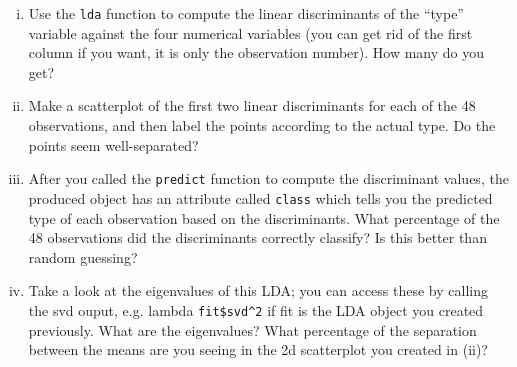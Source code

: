 \documentclass[11pt]{article}
\theoremstyle{definition}
\newcommand{\1}[1]{\mathbf{1} \left \{ #1 \right \}}
\begin{document}
\begin{enumerate}
	\begin{enumerate}[(i)]
		\item Use the \texttt{lda} function to compute the linear discriminants of the ``type'' variable against the four numerical variables (you can get rid of the first column if you want, it is only the observation number). How many do you get?
		\item Make a scatterplot of the first two linear discriminants for each of the 48 observations, and then label the points according to the actual type. Do the points seem well-separated? 
		\item After you called the \texttt{predict} function to compute the discriminant values, the produced object has an attribute called \texttt{class} which tells you the predicted type of each observation based on the discriminants. What percentage of the 48 observations did the discriminants correctly classify? Is this better than random guessing? 
		\item Take a look at the eigenvalues of this LDA; you can access these by calling the svd ouput, e.g. lambda \texttt{fit\$svd\textasciicircum 2} if fit is the LDA object you created previously. What are the eigenvalues? What percentage of the separation between the means are you seeing in the 2d scatterplot you created in (ii)?
	\end{enumerate}
	
\end{enumerate}
\end{document}

